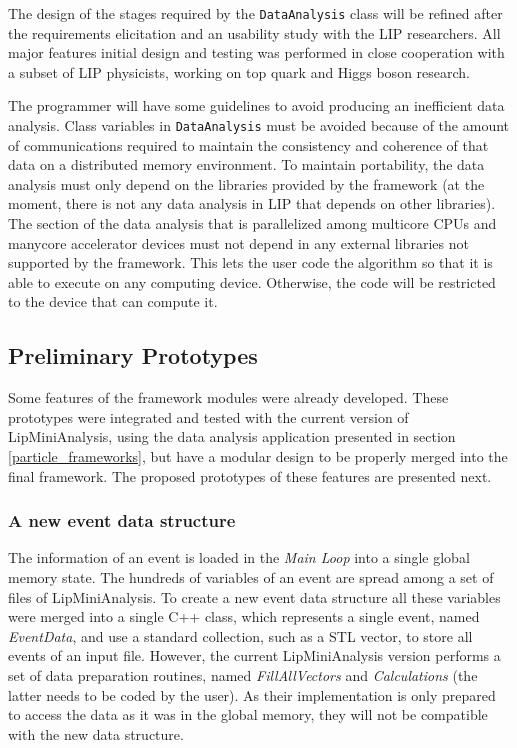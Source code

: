 The design of the stages required by the \texttt{DataAnalysis} class will be refined after the requirements elicitation and an usability study with the LIP researchers. All major features initial design and testing was performed in close cooperation with a subset of LIP physicists, working on top quark and Higgs boson research.

The programmer will have some guidelines to avoid producing an inefficient data analysis. Class variables in \texttt{DataAnalysis} must be avoided because of the amount of communications required to maintain the consistency and coherence of that data on a distributed memory environment. To maintain portability, the data analysis must only depend on the libraries provided by the framework (at the moment, there is not any data analysis in LIP that depends on other libraries). The section of the data analysis that is parallelized among multicore CPUs and manycore accelerator devices must not depend in any external libraries not supported by the framework. This lets the user code the algorithm so that it is able to execute on any computing device. Otherwise, the code will be restricted to the device that can compute it.

\subsection{Preliminary Prototypes}
\label{work_so_far}

Some features of the framework modules were already developed. These prototypes were integrated and tested with the current version of LipMiniAnalysis, using the \ttH data analysis application presented in section \ref{particle_frameworks}, but have a modular design to be properly merged into the final framework. The proposed prototypes of these features are presented next.

\subsubsection*{A new event data structure}

The information of an event is loaded in the \textit{Main Loop} into a single global memory state. The hundreds of variables of an event are spread among a set of files of LipMiniAnalysis. To create a new event data structure all these variables were merged into a single C++ class, which represents a single event, named \textit{EventData}, and use a standard collection, such as a STL vector, to store all events of an input file. However, the current LipMiniAnalysis version performs a set of data preparation routines, named \textit{FillAllVectors} and \textit{Calculations} (the latter needs to be coded by the user). As their implementation is only prepared to access the data as it was in the global memory, they will not be compatible with the new data structure. 

